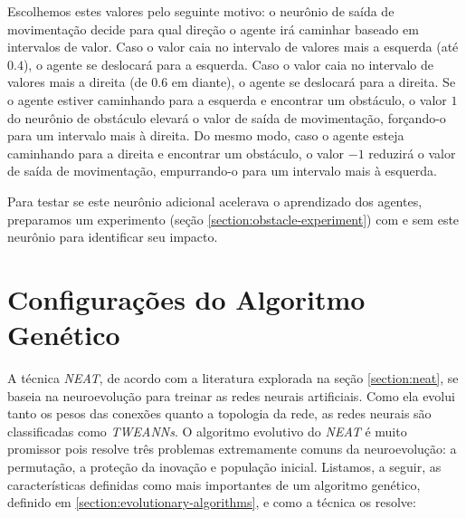 
Escolhemos estes valores pelo seguinte motivo: o neurônio de saída de
movimentação decide para qual direção o agente irá caminhar baseado em
intervalos de valor. Caso o valor caia no intervalo de valores mais a esquerda
(até $0.4$), o agente se deslocará para a esquerda. Caso o valor caia no
intervalo de valores mais a direita (de $0.6$ em diante), o agente se deslocará
para a direita. Se o agente estiver caminhando para a esquerda e encontrar um
obstáculo, o valor $1$ do neurônio de obstáculo elevará o valor de saída de
movimentação, forçando-o para um intervalo mais à direita. Do mesmo modo, caso o
agente esteja caminhando para a direita e encontrar um obstáculo, o valor $-1$
reduzirá o valor de saída de movimentação, empurrando-o para um intervalo mais à
esquerda.

Para testar se este neurônio adicional acelerava o aprendizado dos agentes,
preparamos um experimento (seção \ref{section:obstacle-experiment}) com e sem
este neurônio para identificar seu impacto.

\section{\label{section:modelling-genetic}Configurações do Algoritmo Genético}
A técnica \textit{NEAT}, de acordo com a literatura explorada na seção
\ref{section:neat}, se baseia na neuroevolução para treinar as redes neurais
artificiais. Como ela evolui tanto os pesos das conexões quanto a topologia da
rede, as redes neurais são classificadas como \textit{TWEANNs}. O algoritmo
evolutivo do \textit{NEAT} é muito promissor pois resolve três problemas
extremamente comuns da neuroevolução: a permutação, a proteção da inovação e
população inicial. Listamos, a seguir, as características definidas como mais
importantes de um algoritmo genético, definido em
\ref{section:evolutionary-algorithms}, e como a técnica os resolve:

